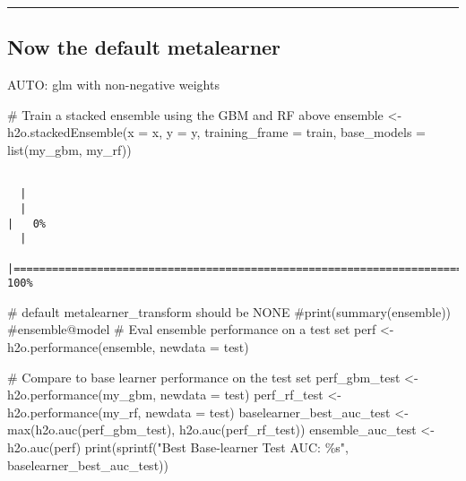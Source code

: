 \documentclass[
  letterpaper,
  DIV=11,
  numbers=noendperiod]{scrartcl}
\newenvironment{Shaded}{\begin{snugshade}}{\end{snugshade}}
\newcommand{\AttributeTok}[1]{\textcolor[rgb]{0.40,0.45,0.13}{#1}}
\newcommand{\CommentTok}[1]{\textcolor[rgb]{0.37,0.37,0.37}{#1}}
\newcommand{\FunctionTok}[1]{\textcolor[rgb]{0.28,0.35,0.67}{#1}}
\newcommand{\NormalTok}[1]{\textcolor[rgb]{0.00,0.23,0.31}{#1}}
\newcommand{\OtherTok}[1]{\textcolor[rgb]{0.00,0.23,0.31}{#1}}
\newcommand{\StringTok}[1]{\textcolor[rgb]{0.13,0.47,0.30}{#1}}
\begin{document}
\begin{center}\rule{0.5\linewidth}{0.5pt}\end{center}

\hypertarget{now-the-default-metalearner}{%
\subsection{Now the default
metalearner}\label{now-the-default-metalearner}}

AUTO: glm with non-negative weights

\begin{Shaded}
\begin{Highlighting}[]
\CommentTok{\# Train a stacked ensemble using the GBM and RF above}
\NormalTok{ensemble }\OtherTok{\textless{}{-}} \FunctionTok{h2o.stackedEnsemble}\NormalTok{(}\AttributeTok{x =}\NormalTok{ x,}
                                \AttributeTok{y =}\NormalTok{ y,}
                                \AttributeTok{training\_frame =}\NormalTok{ train,}
                                \AttributeTok{base\_models =} \FunctionTok{list}\NormalTok{(my\_gbm, my\_rf))}
\end{Highlighting}
\end{Shaded}

\begin{verbatim}

  |                                                                            
  |                                                                      |   0%
  |                                                                            
  |======================================================================| 100%
\end{verbatim}

\begin{Shaded}
\begin{Highlighting}[]
\CommentTok{\# default metalearner\_transform should be NONE}
\CommentTok{\#print(summary(ensemble))}
\CommentTok{\#ensemble@model}
\CommentTok{\# Eval ensemble performance on a test set}
\NormalTok{perf }\OtherTok{\textless{}{-}} \FunctionTok{h2o.performance}\NormalTok{(ensemble, }\AttributeTok{newdata =}\NormalTok{ test)}

\CommentTok{\# Compare to base learner performance on the test set}
\NormalTok{perf\_gbm\_test }\OtherTok{\textless{}{-}} \FunctionTok{h2o.performance}\NormalTok{(my\_gbm, }\AttributeTok{newdata =}\NormalTok{ test)}
\NormalTok{perf\_rf\_test }\OtherTok{\textless{}{-}} \FunctionTok{h2o.performance}\NormalTok{(my\_rf, }\AttributeTok{newdata =}\NormalTok{ test)}
\NormalTok{baselearner\_best\_auc\_test }\OtherTok{\textless{}{-}} \FunctionTok{max}\NormalTok{(}\FunctionTok{h2o.auc}\NormalTok{(perf\_gbm\_test), }\FunctionTok{h2o.auc}\NormalTok{(perf\_rf\_test))}
\NormalTok{ensemble\_auc\_test }\OtherTok{\textless{}{-}} \FunctionTok{h2o.auc}\NormalTok{(perf)}
\FunctionTok{print}\NormalTok{(}\FunctionTok{sprintf}\NormalTok{(}\StringTok{"Best Base{-}learner Test AUC:  \%s"}\NormalTok{, baselearner\_best\_auc\_test))}
\end{Highlighting}
\end{Shaded}
\end{document}

